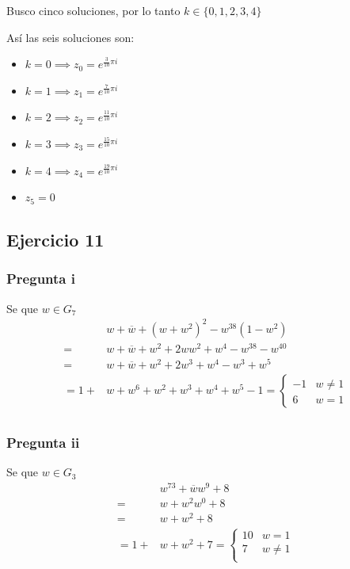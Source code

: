 Busco cinco soluciones, por lo tanto $ k \in \{ 0,1,2,3,4 \} $

Así las seis soluciones son:
\begin{itemize}
    \item $ k = 0 \implies z_0 = e^{\frac{3}{10}\pi i}$
    \item $ k = 1 \implies z_1 = e^{\frac{7}{10}\pi i}$
    \item $ k = 2 \implies z_2 = e^{\frac{11}{10}\pi i}$
    \item $ k = 3 \implies z_3 = e^{\frac{15}{10}\pi i}$
    \item $ k = 4 \implies z_4 = e^{\frac{19}{10}\pi i}$
    \item $ z_5 = 0 $
\end{itemize}

\subsection{Ejercicio 11}

\subsubsection{Pregunta i}

Se que $ w \in G_7 $
\begin{align*}
    &w + \overline{w} + (w + w^2)^2 - w^{38}(1-w^2) \\
    = &w + \overline{w} + w^2 + 2ww^2 + w^4 - w^{38}-w^{40} \\
    = &w + \overline{w} + w^2 + 2w^3 + w^4 - w^3 + w^5 \\
    = 1+ &w + w^6 + w^2 + w^3 + w^4 + w^5 -1 = \begin{cases}
        -1 & w \neq 1 \\
        6 & w = 1
    \end{cases} \\
\end{align*}

\subsubsection{Pregunta ii}

Se que $ w \in G_3 $
\begin{align*}
    &w^{73} + \overline{w}w^9 + 8 \\
    = &w + w^2w^0 + 8 \\
    = &w + w^2 + 8 \\
    = 1+&w + w^2 + 7 = \begin{cases}
        10 & w = 1 \\
        7 & w \neq 1 \\
    \end{cases} 
\end{align*}

